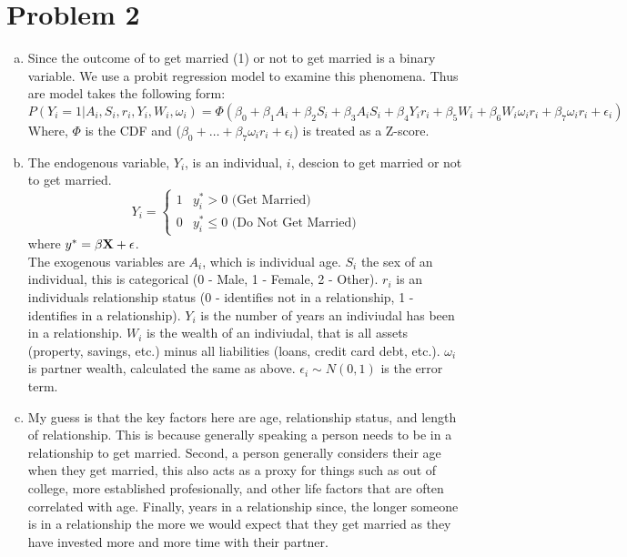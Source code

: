 \documentclass[dvips,12pt]{article}
\begin{document}
	\section*{Problem 2}
\begin{enumerate}[a.]
	\item Since the outcome of to get married (1) or not to get married is a binary variable. We use a probit regression model to examine this phenomena. Thus are model takes the following form:
	$$P(Y_i = 1 | A_i, S_i, r_i, Y_i, W_i, \omega_i) = \Phi(\beta_0 + \beta_1A_i + \beta_2S_i + \beta_3A_iS_i + \beta_4Y_ir_i + \beta_5W_i + \beta_6W_i\omega_ir_i + \beta_7\omega_ir_i + \epsilon_i)$$
	Where, $\Phi$ is the CDF and ($\beta_0 + \dots +\beta_7\omega_ir_i + \epsilon_i$) is treated as a Z-score.

	\item The endogenous variable, $Y_i$, is an individual, $i$, descion to get married or not to get married.
	$$Y_i = \begin{cases} 1 & y_i^* > 0 \text{ (Get Married)} \\ 0 & y_i^* \leq 0 \text{ (Do Not Get Married)} \end{cases}$$
	where $y^* = \bf{\beta}\bf{X}+\epsilon$.
	\vspace{10pt}
	\\ The exogenous variables are $A_i$, which is individual age. $S_i$ the sex of an individual, this is categorical (0 - Male, 1 - Female, 2 - Other). $r_i$ is an individuals relationship status (0 - identifies not in a relationship, 1 - identifies in a relationship). $Y_i$ is the number of years an indiviudal has been in a relationship. $W_i$ is the wealth of an indiviudal, that is all assets (property, savings, etc.) minus all liabilities (loans, credit card debt, etc.). $\omega_i$ is partner wealth, calculated the same as above. $\epsilon_i \sim N(0,1)$ is the error term.

	\item My guess is that the key factors here are age, relationship status, and length of relationship. This is because generally speaking a person needs to be in a relationship to get married. Second, a person generally considers their age when they get married, this also acts as a proxy for things such as out of college, more established profesionally, and other life factors that are often correlated with age. Finally, years in a relationship since, the longer someone is in a relationship the more we would expect that they get married as they have invested more and more time with their partner. 


\end{enumerate}
\end{document}
